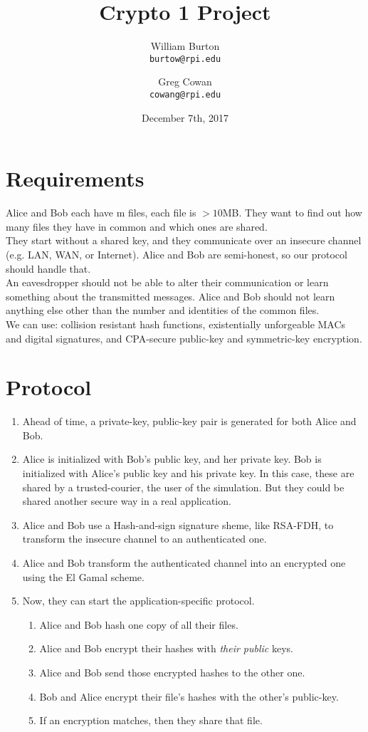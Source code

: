 \documentclass{article}
\title{Crypto 1 Project}
\author{
  William Burton\\
  \texttt{burtow@rpi.edu}
  \and
  Greg Cowan\\
  \texttt{cowang@rpi.edu}
}
\date{December 7th, 2017}
\begin{document}
\maketitle
\begin{flushleft}


\section{Requirements}
Alice and Bob each have m files, each file is $>10$MB. They want to find out
how many files they have in common and which ones are shared. \\
They start without a shared key, and they communicate over an insecure channel
(e.g. LAN, WAN, or Internet). Alice and Bob are semi-honest, so our
protocol should handle that. \\
An eavesdropper should not be able to alter their communication or learn
something about the transmitted messages. Alice and Bob should not learn
anything else other than the number and identities of the common files. \\
We can use: collision resistant hash functions, existentially unforgeable MACs
and digital signatures, and CPA-secure public-key and symmetric-key encryption.


\section{Protocol}
\begin{enumerate}
  \item Ahead of time, a private-key, public-key pair is generated for both Alice and Bob.
  \item Alice is initialized with Bob's public key, and her private key. Bob is initialized with Alice's public key and his private key.
  In this case, these are shared by a trusted-courier, the user of the simulation. But they could be shared another secure way in a real application.
  \item Alice and Bob use a Hash-and-sign signature sheme, like RSA-FDH, to transform the insecure channel to an authenticated one.
  \item Alice and Bob transform the authenticated channel into an encrypted one using the El Gamal scheme.
  \item Now, they can start the application-specific protocol.
    \begin{enumerate}
      \item Alice and Bob hash one copy of all their files.
      \item Alice and Bob encrypt their hashes with \textit{their public} keys.
      \item Alice and Bob send those encrypted hashes to the other one.
      \item Bob and Alice encrypt their file's hashes with the other's public-key.
      \item If an encryption matches, then they share that file.
    \end{enumerate}
\end{enumerate}


\end{flushleft}
\end{document}
